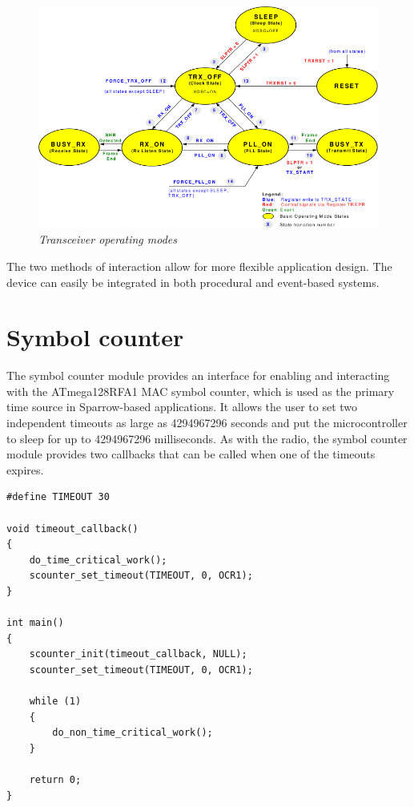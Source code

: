 \begin{figure}[ht]
	\begin{center}
		\includegraphics[width=\textwidth]
		{img/transceiver_operating_modes.png}
	\end{center}
	\caption{\small \itshape{Transceiver operating
	modes\protect\footnotemark}}
\end{figure}

The two methods of interaction allow for more flexible application design.
The device can easily be integrated in both procedural and event-based systems.

\section{Symbol counter}

The symbol counter module provides an interface for enabling and interacting
with the ATmega128RFA1 MAC symbol counter, which is used as the primary time
source in Sparrow-based applications. It allows the user to set two independent
timeouts as large as 4294967296 seconds and put the microcontroller to sleep
for up to 4294967296 milliseconds. As with the radio, the symbol counter module
provides two callbacks that can be called when one of the timeouts expires.

\lstset{
	language=C, numbers=none, caption=Time critical action snippet,
	label=lst:scounter_snippet
}
\begin{lstlisting}
#define TIMEOUT	30

void timeout_callback()
{
	do_time_critical_work();
	scounter_set_timeout(TIMEOUT, 0, OCR1);
}

int main()
{
	scounter_init(timeout_callback, NULL);
	scounter_set_timeout(TIMEOUT, 0, OCR1);

	while (1)
	{
		do_non_time_critical_work();
	}

	return 0;
}
\end{lstlisting}

